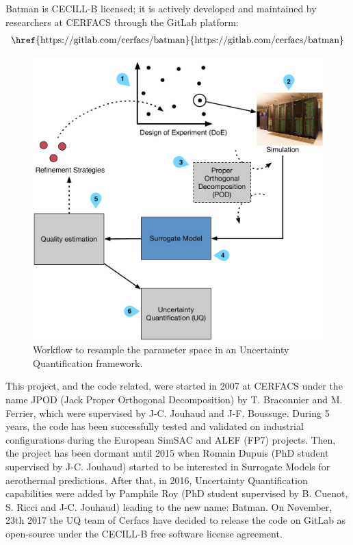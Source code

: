 Batman is CECILL-B licensed; it is actively developed and maintained by researchers at CERFACS through the GitLab platform:
\begin{align}
\text{\href{https://gitlab.com/cerfacs/batman}{https://gitlab.com/cerfacs/batman}}	\nonumber
\end{align}

\begin{figure}[!h]
\centering
\includegraphics[width=0.8\linewidth,keepaspectratio]{fig/contributions/batman/workflow.pdf}
\caption{Workflow to resample the parameter space in an Uncertainty Quantification framework.}
\label{fig:batman_workflow}
\end{figure}

This project, and the code related, were started in 2007 at CERFACS under the name JPOD (Jack Proper Orthogonal Decomposition) by T. Braconnier and M. Ferrier, which were supervised by J-C. Jouhaud and J-F. Boussuge. During 5 years, the code has been successfully tested and validated on industrial configurations during the European SimSAC and ALEF (FP7) projects. Then, the project has been dormant until 2015 when Romain Dupuis (PhD student supervised by J-C. Jouhaud) started to be interested in Surrogate Models for aerothermal predictions. After that, in 2016, Uncertainty Quantification capabilities were added by Pamphile Roy (PhD student supervised by B. Cuenot, S. Ricci and J-C. Jouhaud) leading to the new name: Batman. On November, 23th 2017 the UQ team of Cerfacs have decided to release the code on GitLab as open-source under the CECILL-B free software license agreement.

